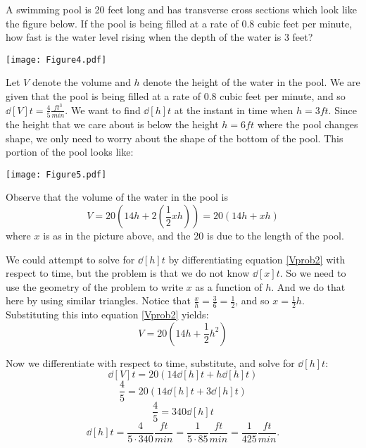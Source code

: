 \documentclass[nooutcomes]{ximera}
\begin{document}
\begin{problem}
A swimming pool is 20 feet long and has transverse cross sections which look like the figure below.   If the pool is being filled at a rate of 0.8 cubic feet per minute, how fast is the water level rising when the depth of the water is 3 feet? 
	\begin{image}
	\texttt{[image: Figure4.pdf]}
	\end{image}
	
		\begin{freeResponse}
		Let $V$ denote the volume and $h$ denote the height of the water in the pool.  We are given that the pool is being filled at a rate of $0.8$ cubic feet per minute, and so $\dd[V]{t} = \frac{4}{5} \frac{ft^3}{min}$.  We want to find $\dd[h]{t}$ at the instant in time when $h=3 ft$.  Since the height that we care about is below the height $h=6 ft$ where the pool changes shape, we only need to worry about the shape of the bottom of the pool.  This portion of the pool looks like:
		
		\begin{image}
		\texttt{[image: Figure5.pdf]}
		\end{image}
		
		Observe that the volume of the water in the pool is
		\begin{equation}\label{Vprob2}
		V = 20 \left( 14h + 2 \left( \frac{1}{2} xh \right) \right) = 20 \left( 14h + xh \right)
		\end{equation}
		where $x$ is as in the picture above, and the 20 is due to the length of the pool.  
		
		We could attempt to solve for $\dd[h]{t}$ by differentiating equation \ref{Vprob2} with respect to time, but the problem is that we do not know $\dd[x]{t}$.  So we need to use the geometry of the problem to write $x$ as a function of $h$.  And we do that here by using similar triangles.  Notice that $\frac{x}{h} = \frac{3}{6} = \frac{1}{2}$, and so $x = \frac{1}{2} h$.  Substituting this into equation \ref{Vprob2} yields:
		$$ V = 20 \left( 14h + \frac{1}{2} h^2 \right) $$
		
		Now we differentiate with respect to time, substitute, and solve for $\dd[h]{t}$:
		$$ \dd[V]{t} = 20 \left( 14 \dd[h]{t} + h \dd[h]{t} \right) $$
		$$ \frac{4}{5} = 20 \left( 14 \dd[h]{t} + 3 \dd[h]{t} \right) $$
		$$ \frac{4}{5} = 340 \dd[h]{t} $$
		$$ \dd[h]{t} = \frac{4}{5 \cdot 340} \frac{ft}{min} = \frac{1}{5 \cdot 85} \frac{ft}{min} = \frac{1}{425} \frac{ft}{min}. $$
		
		\end{freeResponse}
		
		
		

\end{problem}
	
\end{document}
